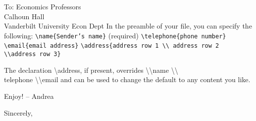 \documentclass[color-logo]{letter}
\begin{document}
\begin{letter}{
To: Economics Professors\\
Calhoun Hall \\
Vanderbilt University Econ Dept}
In the preamble of your file, you can specify the following:\newline
\newline
\texttt{\textbackslash name\{Sender's name\}} (required) \newline
\texttt{\textbackslash telephone\{phone number\}} \newline
\texttt{\textbackslash email\{email address\}}\newline
\texttt{\textbackslash address\{address row 1 \textbackslash \textbackslash 
address row 2 \textbackslash \textbackslash  address row 3\}}

The declaration \textbackslash address, if present, overrides 
\textbackslash \textbackslash name \textbackslash \textbackslash 
\\telephone \textbackslash \textbackslash email and can be used to change the
default to any content you like.\bigskip




Enjoy! -- Andrea

\closing{
Sincerely,
}

\end{letter}
\end{document}
